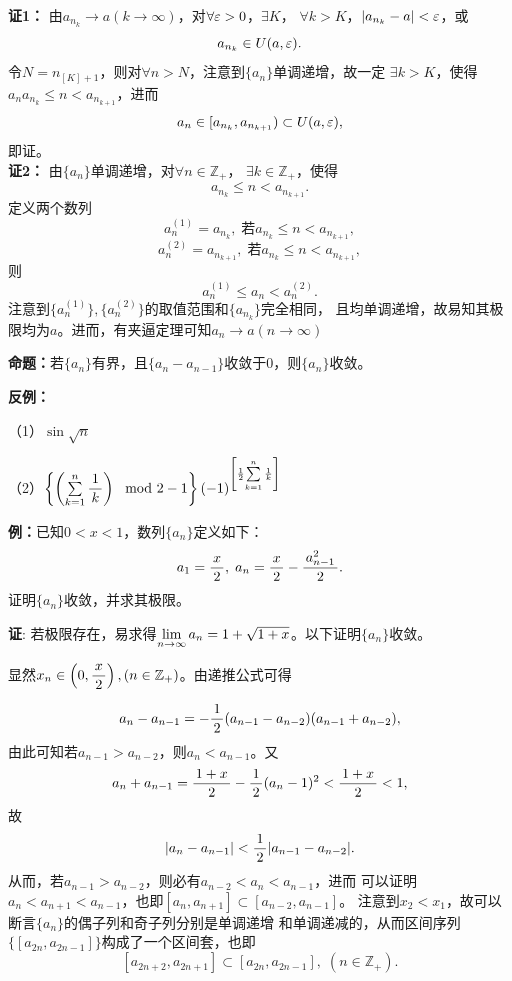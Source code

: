   {\bf 证1：} 由$a_{n_k}\to a(k\to\infty)$，对$\forall\varepsilon>0$，$\exists K$，
  $\forall k>K$，$|a_{n_k}-a|<\varepsilon$，或
  $$a_{n_k}\in U(a,\varepsilon).$$
  令$N=n_{[K]+1}$，则对$\forall n>N$，注意到$\{a_n\}$单调递增，故一定
  $\exists k>K$，使得$a_na_{n_k}\leq n<a_{n_{k+1}}$，进而
  $$a_n\in[a_{n_k},a_{n_{k+1}})\subset U(a,\varepsilon),$$
  即证。\\
  {\bf 证2：} 由$\{a_n\}$单调递增，对$\forall n\in\mathbb{Z}_+$，
  $\exists k\in\mathbb{Z}_+$，使得
  $$a_{n_k}\leq n<a_{n_{k+1}}.$$
  定义两个数列
  $$a_n^{(1)}=a_{n_k},\;\mbox{若}a_{n_k}\leq n<a_{n_{k+1}},$$
  $$a_n^{(2)}=a_{n_{k+1}},\;\mbox{若}a_{n_k}\leq n<a_{n_{k+1}},$$
  则
  $$a_n^{(1)}\leq a_n<a_n^{(2)}.$$
  注意到$\{a_n^{(1)}\},\{a_n^{(2)}\}$的取值范围和$\{a_{n_k}\}$完全相同，
  且均单调递增，故易知其极限均为$a$。进而，有夹逼定理可知$a_n\to a(n\to\infty)$

\bigskip

{\bf 命题：}若$\{a_n\}$有界，且$\{a_n-a_{n-1}\}$收敛于$0$，则$\{a_n\}$收敛。

{\bf 反例：}

（1）$\sin\sqrt n$

（2）$\left\{\left(\sum\limits_{k=1}^n\displaystyle\frac{\,{1}\,}{\,{k}\,}\right)\mod
2-1\right\}(-1)^{\left[\frac12{\sum\limits_{k=1}^n\frac1k}\right]}$

\bigskip

{\bf 例：}已知$0<x<1$，数列$\{a_n\}$定义如下：
$$a_1=\displaystyle\frac{\,{x}\,}{\,{2}\,},\;a_n=\displaystyle\frac{\,{x}\,}{\,{2}\,}-\displaystyle\frac{\,{a_{n-1}^2}\,}{\,{2}\,}.$$
证明$\{a_n\}$收敛，并求其极限。

{\bf 证}: 若极限存在，易求得$\lim\limits_{n\to\infty} a_n=1+\sqrt{1+x}$。以下证明$\{a_n\}$收敛。

显然$x_n\in\left(0,\displaystyle\frac{\,{x}\,}{\,{2}\,}\right),(n\in\mathbb Z_+)$。由递推公式可得


$$a_n-a_{n-1}=-\displaystyle\frac{\,{1}\,}{\,{2}\,}(a_{n-1}-a_{n-2})(a_{n-1}+a_{n-2}),$$
由此可知若$a_{n-1}>a_{n-2}$，则$a_n<a_{n-1}$。又
$$a_n+a_{n-1}=\displaystyle\frac{\,{1+x}\,}{\,{2}\,}-\displaystyle\frac{\,{1}\,}{\,{2}\,}(a_n-1)^2<\displaystyle\frac{\,{1+x}\,}{\,{2}\,}<1,$$
故
$$|a_n-a_{n-1}|<\displaystyle\frac{\,{1}\,}{\,{2}\,}|a_{n-1}-a_{n-2}|.$$
从而，若$a_{n-1}>a_{n-2}$，则必有$a_{n-2}<a_n<a_{n-1}$，进而
可以证明$a_n<a_{n+1}<a_{n-1}$，也即$[a_n,a_{n+1}]\subset[a_{n-2},a_{n-1}]$。
注意到$x_2<x_1$，故可以断言$\{a_n\}$的偶子列和奇子列分别是单调递增
和单调递减的，从而区间序列$\{[a_{2n},a_{2n-1}]\}$构成了一个区间套，也即
$$[a_{2n+2},a_{2n+1}]\subset[a_{2n},a_{2n-1}],\;(n\in\mathbb Z_+).$$

